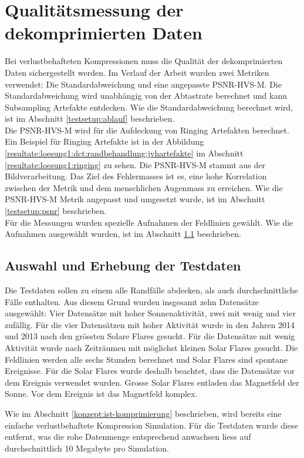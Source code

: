 \section{Qualitätsmessung der dekomprimierten Daten}
Bei verlustbehafteten Kompressionen muss die Qualität der dekomprimierten Daten sichergestellt werden. Im Verlauf der Arbeit wurden zwei Metriken verwendet: Die Standardabweichung und eine angepasste PSNR-HVS-M. Die Standardabweichung wird unabhängig von der Abtastrate berechnet und kann Subsampling Artefakte entdecken. Wie die Standardabweichung berechnet wird, ist im Abschnitt \ref{testsetup:ablauf} beschrieben.\\
Die PSNR-HVS-M wird für die Aufdeckung von Ringing Artefakten \cite{wiki:ringing:artefacts} berechnet. Ein Beispiel für Ringing Artefakte ist in der Abbildung \ref{resultate:loesung1:dct:randbehandlung:jvhartefakte} im Abschnitt \ref{resultate:loesung1:ringing} zu sehen. Die PSNR-HVS-M stammt aus der Bildverarbeitung. Das Ziel des Fehlermasses ist es, eine hohe Korrelation zwischen der Metrik und dem menschlichen Augenmass zu erreichen. Wie die PSNR-HVS-M Metrik angepasst und umgesetzt wurde, ist im Abschnitt \ref{testsetup:psnr} beschrieben.\\
Für die Messungen wurden spezielle Aufnahmen der Feldlinien gewählt. Wie die Aufnahmen ausgewählt wurden, ist im Abschnitt \ref{testsetup:auswahl_erhebung} beschrieben.

\subsection{Auswahl und Erhebung der Testdaten}\label{testsetup:auswahl_erhebung}
Die Testdaten sollen zu einem alle Randfälle abdecken, als auch durchschnittliche Fälle enthalten. Aus diesem Grund wurden insgesamt zehn Datensätze ausgewählt: Vier Datensätze mit hoher Sonnenaktivität, zwei mit wenig und vier zufällig. Für die vier Datensätzen mit hoher Aktivität wurde in den Jahren 2014 und 2013 nach den grössten Solare Flares gesucht. Für die Datensätze mit wenig Aktivität wurde nach Zeiträumen mit möglichst kleinen Solar Flares gesucht.
Die Feldlinien werden alle sechs Stunden berechnet und Solar Flares sind spontane Ereignisse. Für die Solar Flares wurde deshalb beachtet, dass die Datensätze vor dem Ereignis verwendet wurden. Grosse Solar Flares entladen das Magnetfeld der Sonne. Vor dem Ereignis ist das Magnetfeld komplex.

Wie im Abschnitt \ref{konzept:ist-komprimierung} beschrieben, wird bereits eine einfache verlustbehaftete Kompression Simulation. Für die Testdaten wurde diese entfernt, was die rohe Datenmenge entsprechend anwachsen liess auf durchschnittlich 10 Megabyte pro Simulation.

